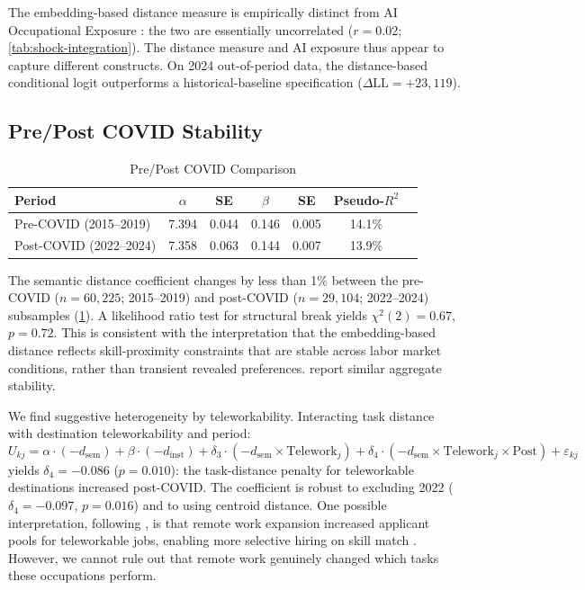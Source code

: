 \documentclass[12pt]{article}
\begin{document}
The embedding-based distance measure is empirically distinct from AI Occupational Exposure \citep{FeltenRajSeamans2021}: the two are essentially uncorrelated ($r = 0.02$; \cref{tab:shock-integration}). The distance measure and AI exposure thus appear to capture different constructs. On 2024 out-of-period data, the distance-based conditional logit outperforms a historical-baseline specification ($\Delta \text{LL} = +23{,}119$).


\subsection{Pre/Post COVID Stability}
\label{subsec:covid-stability}


\begin{table}[h!]
\centering
\caption{Pre/Post COVID Comparison}
\label{tab:covid-stability}
\begin{tabular}{lcccccc}
\toprule
\textbf{Period} & $\alpha$ & \textbf{SE} & $\beta$ & \textbf{SE} & \textbf{Pseudo-$R^2$} \\
\midrule
Pre-COVID (2015--2019) & 7.394 & 0.044 & 0.146 & 0.005 & 14.1\% \\
Post-COVID (2022--2024) & 7.358 & 0.063 & 0.144 & 0.007 & 13.9\% \\
\bottomrule
\end{tabular}
\end{table}


The semantic distance coefficient changes by less than 1\% between the pre-COVID ($n = 60{,}225$; 2015--2019) and post-COVID ($n = 29{,}104$; 2022--2024) subsamples (\cref{tab:covid-stability}). A likelihood ratio test for structural break yields $\chi^2(2) = 0.67$, $p = 0.72$. This is consistent with the interpretation that the embedding-based distance reflects skill-proximity constraints that are stable across labor market conditions, rather than transient revealed preferences. \citet{PizzinelliShibata2023} report similar aggregate stability.

We find suggestive heterogeneity by teleworkability. Interacting task distance with destination teleworkability \citep{DingelNeiman2020} and period:
\[
U_{kj} = \alpha \cdot (-d_{\mathrm{sem}}) + \beta \cdot (-d_{\mathrm{inst}}) + \delta_3 \cdot (-d_{\mathrm{sem}} \times \mathrm{Telework}_j) + \delta_4 \cdot (-d_{\mathrm{sem}} \times \mathrm{Telework}_j \times \mathrm{Post}) + \varepsilon_{kj}
\]
yields $\delta_4 = -0.086$ ($p = 0.010$): the task-distance penalty for teleworkable destinations increased post-COVID. The coefficient is robust to excluding 2022 ($\delta_4 = -0.097$, $p = 0.016$) and to using centroid distance. One possible interpretation, following \citet{ModestinoShoagBallance2020}, is that remote work expansion increased applicant pools for teleworkable jobs, enabling more selective hiring on skill match \citep{HsuTambe2022,EmanuelHarrington2024}. However, we cannot rule out that remote work genuinely changed which tasks these occupations perform.
\end{document}
